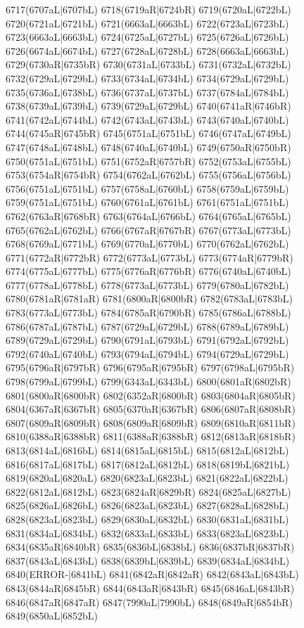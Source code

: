 6717(6707aL|6707bL) 6718(6719aR|6724bR) 6719(6720aL|6722bL) 6720(6721aL|6721bL) 6721(6663aL|6663bL) 6722(6723aL|6723bL) \\6723(6663aL|6663bL) 6724(6725aL|6727bL) 6725(6726aL|6726bL) 6726(6674aL|6674bL) 6727(6728aL|6728bL) 6728(6663aL|6663bL) 6729(6730aR|6735bR) 6730(6731aL|6733bL) 6731(6732aL|6732bL) \\6732(6729aL|6729bL) 6733(6734aL|6734bL) 6734(6729aL|6729bL) 6735(6736aL|6738bL) 6736(6737aL|6737bL) 6737(6784aL|6784bL) 6738(6739aL|6739bL) 6739(6729aL|6729bL) 6740(6741aR|6746bR) \\6741(6742aL|6744bL) 6742(6743aL|6743bL) 6743(6740aL|6740bL) 6744(6745aR|6745bR) 6745(6751aL|6751bL) 6746(6747aL|6749bL) 6747(6748aL|6748bL) 6748(6740aL|6740bL) 6749(6750aR|6750bR) \\6750(6751aL|6751bL) 6751(6752aR|6757bR) 6752(6753aL|6755bL) 6753(6754aR|6754bR) 6754(6762aL|6762bL) 6755(6756aL|6756bL) 6756(6751aL|6751bL) 6757(6758aL|6760bL) 6758(6759aL|6759bL) \\6759(6751aL|6751bL) 6760(6761aL|6761bL) 6761(6751aL|6751bL) 6762(6763aR|6768bR) 6763(6764aL|6766bL) 6764(6765aL|6765bL) 6765(6762aL|6762bL) 6766(6767aR|6767bR) 6767(6773aL|6773bL) \\6768(6769aL|6771bL) 6769(6770aL|6770bL) 6770(6762aL|6762bL) 6771(6772aR|6772bR) 6772(6773aL|6773bL) 6773(6774aR|6779bR) 6774(6775aL|6777bL) 6775(6776aR|6776bR) 6776(6740aL|6740bL) \\6777(6778aL|6778bL) 6778(6773aL|6773bL) 6779(6780aL|6782bL) 6780(6781aR|6781aR) 6781(6800aR|6800bR) 6782(6783aL|6783bL) 6783(6773aL|6773bL) 6784(6785aR|6790bR) 6785(6786aL|6788bL) \\6786(6787aL|6787bL) 6787(6729aL|6729bL) 6788(6789aL|6789bL) 6789(6729aL|6729bL) 6790(6791aL|6793bL) 6791(6792aL|6792bL) 6792(6740aL|6740bL) 6793(6794aL|6794bL) 6794(6729aL|6729bL) \\6795(6796aR|6797bR) 6796(6795aR|6795bR) 6797(6798aL|6795bR) 6798(6799aL|6799bL) 6799(6343aL|6343bL) 6800(6801aR|6802bR) 6801(6800aR|6800bR) 6802(6352aR|6800bR) 6803(6804aR|6805bR) \\6804(6367aR|6367bR) 6805(6370aR|6367bR) 6806(6807aR|6808bR) 6807(6809aR|6809bR) 6808(6809aR|6809bR) 6809(6810aR|6811bR) 6810(6388aR|6388bR) 6811(6388aR|6388bR) 6812(6813aR|6818bR) \\6813(6814aL|6816bL) 6814(6815aL|6815bL) 6815(6812aL|6812bL) 6816(6817aL|6817bL) 6817(6812aL|6812bL) 6818(6819bL|6821bL) 6819(6820aL|6820aL) 6820(6823aL|6823bL) 6821(6822aL|6822bL) \\6822(6812aL|6812bL) 6823(6824aR|6829bR) 6824(6825aL|6827bL) 6825(6826aL|6826bL) 6826(6823aL|6823bL) 6827(6828aL|6828bL) 6828(6823aL|6823bL) 6829(6830aL|6832bL) 6830(6831aL|6831bL) \\6831(6834aL|6834bL) 6832(6833aL|6833bL) 6833(6823aL|6823bL) 6834(6835aR|6840bR) 6835(6836bL|6838bL) 6836(6837bR|6837bR) 6837(6843aL|6843bL) 6838(6839bL|6839bL) 6839(6834aL|6834bL) \\6840(ERROR-|6841bL) 6841(6842aR|6842aR) 6842(6843aL|6843bL) 6843(6844aR|6845bR) 6844(6843aR|6843bR) 6845(6846aL|6843bR) 6846(6847aR|6847aR) 6847(7990aL|7990bL) 6848(6849aR|6854bR) \\6849(6850aL|6852bL) 